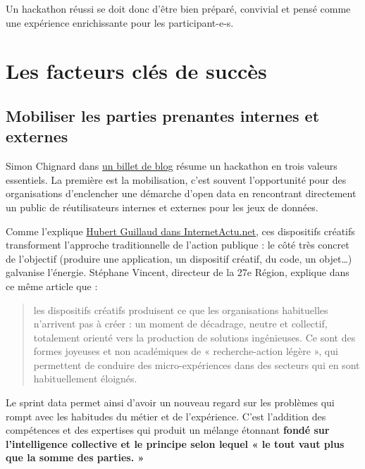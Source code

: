 \documentclass[]{book}
\begin{document}
Un hackathon réussi se doit donc d'être bien préparé, convivial et pensé
comme une expérience enrichissante pour les participant-e-s.

\section{Les facteurs clés de succès}\label{les-facteurs-cles-de-succes}

\subsection{Mobiliser les parties prenantes internes et
externes}\label{mobiliser-les-parties-prenantes-internes-et-externes}

Simon Chignard dans
\href{https://donneesouvertes.info/2013/01/08/un-hackaton-sinon-rien/}{un
billet de blog} résume un hackathon en trois valeurs essentiels. La
première est la mobilisation, c'est souvent l'opportunité pour des
organisations d'enclencher une démarche d'open data en rencontrant
directement un public de réutilisateurs internes et externes pour les
jeux de données.

Comme l'explique
\href{http://www.internetactu.net/2012/11/16/les-dispositifs-creatifs-en-questions-22-les-limites-a-la-creativite-collective/}{Hubert
Guillaud dans InternetActu.net}, ces dispositifs créatifs transforment
l'approche traditionnelle de l'action publique : le côté très concret de
l'objectif (produire une application, un dispositif créatif, du code, un
objet\ldots{}) galvanise l'énergie. Stéphane Vincent, directeur de la
27e Région, explique dans ce même article que :

\begin{quote}
les dispositifs créatifs produisent ce que les organisations habituelles
n'arrivent pas à créer : un moment de décadrage, neutre et collectif,
totalement orienté vers la production de solutions ingénieuses. Ce sont
des formes joyeuses et non académiques de « recherche-action légère »,
qui permettent de conduire des micro-expériences dans des secteurs qui
en sont habituellement éloignés.
\end{quote}

Le sprint data permet ainsi d'avoir un nouveau regard sur les problèmes
qui rompt avec les habitudes du métier et de l'expérience. C'est
l'addition des compétences et des expertises qui produit un mélange
étonnant \textbf{fondé sur l'intelligence collective et le principe
selon lequel « le tout vaut plus que la somme des parties. »}
\end{document}
